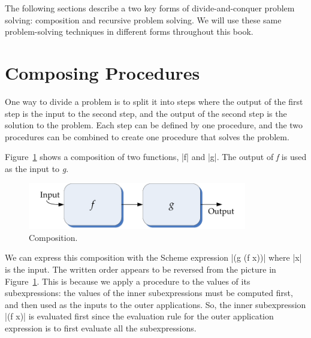 \begin{schemeregion}
The following sections describe a two key forms of divide-and-conquer problem solving: composition and recursive problem solving.  We will use these same problem-solving techniques in different forms throughout this book.


\section{Composing Procedures}\label{sec:compose}

One way to divide a problem is to split it into steps where the output of the first step is the input to the second step, and the output of the second step is the solution to the problem.  Each step can be defined by one procedure, and the two procedures can be combined to create one procedure that solves the problem.  

Figure~\ref{fig:composition} shows a composition of two functions, \scheme|f| and \scheme|g|.  The output of \emph{f} is used as the input to \emph{g}.  

\begin{figure}[!ht]
\begin{center}
\includegraphics[height=0.8in]{figures/composition.pdf}
\caption{Composition.\label{fig:composition}}
\end{center}
\end{figure}

We can express this composition with the Scheme expression \scheme|(g (f x))| where \scheme|x| is the input.  The written order appears to be reversed from the picture in  Figure~\ref{fig:composition}.  This is because we apply a procedure to the values of its subexpressions: the values of the inner subexpressions must be computed first, and then used as the inputs to the outer applications.  So, the inner subexpression \scheme|(f x)| is evaluated first since the evaluation rule for the outer application expression is to first evaluate all the subexpressions.  


\end{schemeregion}
